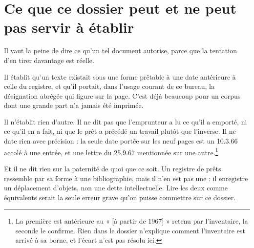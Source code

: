 \documentclass[11pt,a4paper]{article}
\begin{document}
\section*{Ce que ce dossier peut et ne peut pas servir à établir}

Il vaut la peine de dire ce qu'un tel document autorise, parce que la tentation
d'en tirer davantage est réelle.

Il établit qu'un texte existait sous une forme prêtable à une date antérieure à
celle du registre, et qu'il portait, dans l'usage courant de ce bureau, la
désignation abrégée qui figure sur la page. C'est déjà beaucoup pour un corpus
dont une grande part n'a jamais été imprimée.

Il n'établit rien d'autre. Il ne dit pas que l'emprunteur a lu ce qu'il a
emporté, ni ce qu'il en a fait, ni que le prêt a précédé un travail plutôt que
l'inverse. Il ne date rien avec précision : la seule date portée sur les neuf
pages est un 10.3.66 accolé à une entrée, et une lettre du 25.9.67 mentionnée
sur une autre.\footnote{La première est antérieure au « [à partir de 1967] »
retenu par l'inventaire, la seconde le confirme. Rien dans le dossier n'explique
comment l'inventaire est arrivé à sa borne, et l'écart n'est pas résolu ici.}

Et il ne dit rien sur la paternité de quoi que ce soit. Un registre de prêts
ressemble par sa forme à une bibliographie, mais il n'en est pas une : il
enregistre un déplacement d'objets, non une dette intellectuelle. Lire les deux
comme équivalents serait la seule erreur grave qu'on puisse commettre sur ce
dossier.
\end{document}
